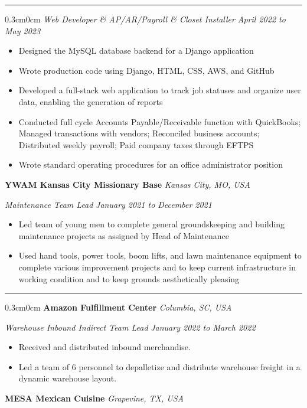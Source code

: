 \documentclass[10pt, a4paper]{article}
\newcommand{\rangesep}{to\xspace}  %
\renewcommand{\date}[1]{\textit{#1}}
\newcommand{\location}[1]{\textit{#1}}
\newcommand{\heading}[1]{
    \makebox[0pt][l]{\Large \sc \hspace{2pt}#1}
    \rule[-0.7ex]{\columnwidth}{0.5pt}\vspace{1.0ex}
}
\newcommand{\subheading}[1]{{\bfseries #1}}
\newcommand{\subheadSkip}{\vspace{0.7ex}}
\newenvironment{mysection}[1]
{\vspace{2.5ex}
\heading{#1}
\begin{adjustwidth}{0.3cm}{0cm}}
{\end{adjustwidth} }
\begin{document}
\begin{mysection}{Employment}
        \textit{Web Developer \& AP/AR/Payroll \& Closet Installer } \hfill \date{April 2022 \rangesep May 2023}
        \vspace{0.1ex}
        \begin{itemize}
            \item Designed the MySQL database backend for a Django application 
            \item Wrote production code using Django, HTML, CSS, AWS, and GitHub
            \item Developed a full-stack web application to track job statuses and organize user data, enabling the generation of reports
            \item Conducted full cycle Accounts Payable/Receivable function with QuickBooks; Managed transactions with vendors; Reconciled business accounts; Distributed weekly payroll; Paid company taxes through EFTPS
            \item Wrote standard operating procedures for an office administrator position
        \end{itemize}
        \subheadSkip
        \subheading{YWAM Kansas City Missionary Base} \hfill \location{Kansas City, MO, USA}

        \vspace{0.1ex}
        \textit{Maintenance Team Lead} \hfill \date{January 2021 \rangesep December 2021}
        \begin{itemize}
            \item Led team of young men to complete general groundskeeping and building maintenance projects as assigned by Head of Maintenance
            \item Used hand tools, power tools, boom lifts, and lawn maintenance equipment to complete various improvement projects and to keep current infrastructure in working condition and to keep grounds aesthetically pleasing
        \end{itemize}
        \subheadSkip
    \newpage
    \begin{mysection}{Employment \large{(continued)}}
        \subheading{Amazon Fulfillment Center} \hfill \location{Columbia, SC, USA}

        \vspace{0.1ex}
        \textit{Warehouse Inbound Indirect Team Lead} \hfill \date{January 2022 \rangesep March 2022}
        \begin{itemize}
            \item Received and distributed inbound merchandise. 
            \item Led a team of 6 personnel to depalletize and distribute warehouse freight in a dynamic warehouse layout.
        \end{itemize}
        \subheadSkip
        \subheading{MESA Mexican Cuisine} \hfill \location{Grapevine, TX, USA}


\end{mysection}
\end{mysection}
\end{document}
